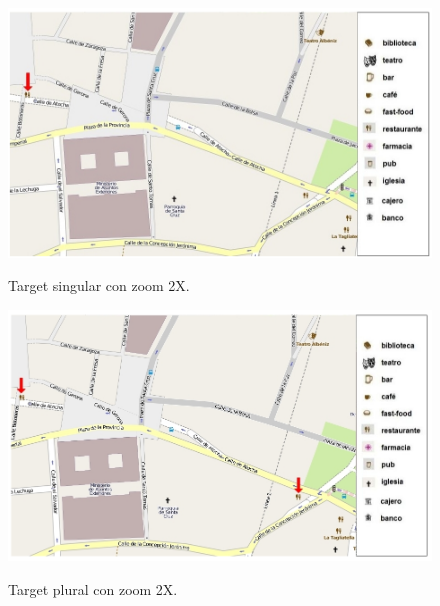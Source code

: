 \begin{figure}
\centering
\includegraphics[width=\textwidth]{figures/rest-singular2x.png}\\[0pt]
\caption{Target singular con zoom 2X.}
\label{rest-singular2x}
\end{figure}
\begin{figure}
\centering
\includegraphics[width=\textwidth]{figures/rest-plural2x.png}\\[0pt]
\caption{Target plural con zoom 2X.}
\label{rest-plural2x}
\end{figure}


